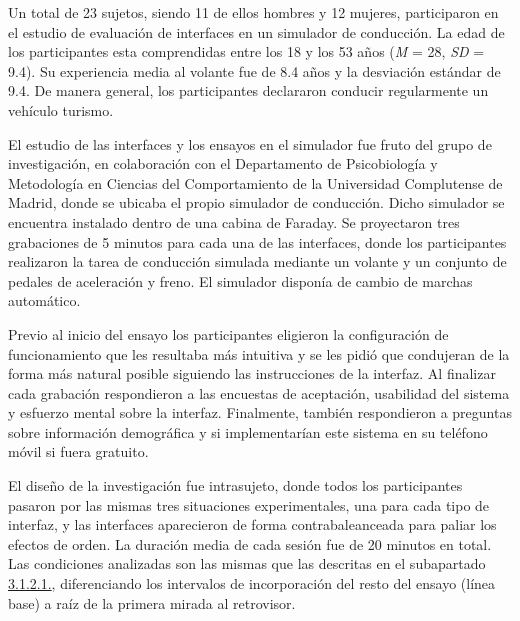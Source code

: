 Un total de 23 sujetos, siendo 11 de ellos hombres y 12 mujeres, participaron en el estudio de evaluación de interfaces en un simulador de conducción. La edad de los participantes esta comprendidas entre los 18 y los 53 años (\emph{M} = 28, \emph{SD} = 9.4). Su experiencia media al volante fue de 8.4 años y la desviación estándar de 9.4. De manera general, los participantes declararon conducir regularmente un vehículo turismo.

El estudio de las interfaces y los ensayos en el simulador fue fruto del grupo de investigación, en colaboración con el Departamento de  Psicobiología y Metodología en Ciencias del Comportamiento de la Universidad Complutense de Madrid, donde se ubicaba el propio simulador de conducción. Dicho simulador se encuentra instalado dentro de una cabina de Faraday. Se proyectaron tres grabaciones de 5 minutos para cada una de las interfaces, donde los participantes realizaron la tarea de conducción simulada mediante un volante y un conjunto de pedales de aceleración y freno. El simulador disponía de cambio de marchas automático. 

Previo al inicio del ensayo los participantes eligieron la configuración de funcionamiento que les resultaba más intuitiva y se les pidió que condujeran de la forma más natural posible siguiendo las instrucciones de la interfaz. Al finalizar cada grabación respondieron a las encuestas de aceptación, usabilidad del sistema y esfuerzo mental sobre la interfaz. Finalmente, también respondieron a preguntas sobre información demográfica y si implementarían este sistema en su teléfono móvil si fuera gratuito.

El diseño de la investigación fue intrasujeto, donde todos los participantes pasaron por las mismas tres situaciones experimentales, una para cada tipo de interfaz, y las interfaces aparecieron de forma contrabaleanceada para paliar los efectos de orden. La duración media de cada sesión fue de 20 minutos en total. Las condiciones analizadas son las mismas que las descritas en el subapartado \hyperref[3121]{3.1.2.1.}, diferenciando los intervalos de incorporación del resto del ensayo (línea base) a raíz de la primera mirada al retrovisor. 

